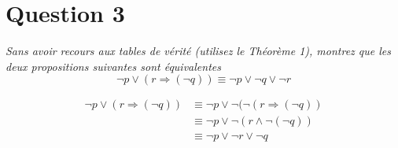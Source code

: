 \section*{Question 3}

\noindent
\emph{Sans avoir recours aux tables de vérité (utilisez le Théorème 1), montrez que les deux propositions
suivantes sont équivalentes}
\[\neg p \vee  (r \Rightarrow (\neg q)) \equiv \neg p \vee \neg q \vee \neg r\]

\begin{align*}
	\neg p \vee (r \Rightarrow (\neg q)) & \equiv \neg p \vee \neg(\neg(r \Rightarrow (\neg q)) \\
	                                     & \equiv \neg p \vee \neg(r \wedge \neg(\neg q))       \\
	                                     & \equiv \neg p \vee \neg r \vee \neg q
\end{align*}